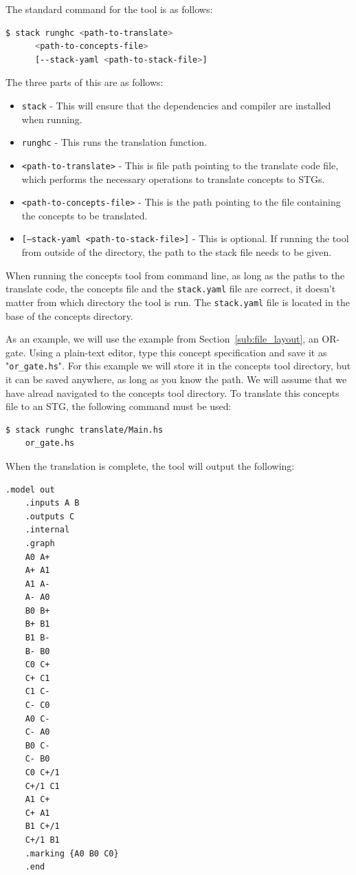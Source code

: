 \documentclass[british,conference,compsoc]{IEEEtran}
\begin{document}
The standard command for the tool is as follows:

\begin{lstlisting}[language=bash]
  $ stack runghc <path-to-translate> 
      <path-to-concepts-file> 
      [--stack-yaml <path-to-stack-file>]
\end{lstlisting}

The three parts of this are as follows:
\begin{itemize}
  \item \texttt{stack} - This will ensure that the dependencies and compiler 
  	are installed when running.
  \item \texttt{runghc} - This runs the translation function.
  \item \texttt{<path-to-translate>} - This is file path pointing to the 
  	translate code file, which performs the necessary operations to translate 
	concepts to STGs.
  \item \texttt{<path-to-concepts-file>} - This is the path pointing to the file
  	containing the concepts to be translated.
  \item \texttt{[--stack-yaml <path-to-stack-file>]} - This is optional. If 
  	running the tool from outside of the directory, the path to the stack file 
	 needs to be given.
\end{itemize}

When running the concepts tool from command line, as long as the paths to the 
translate code, the concepts file and the \texttt{stack.yaml} file are correct,
it doesn't matter from which directory the tool is run.  The \texttt{stack.yaml}
file is located in the base of the concepts directory.

As an example, we will use the example from Section~\ref{sub:file_layout}, an 
OR-gate. Using a plain-text editor, type this concept specification and save it
as "\texttt{or\_gate.hs}". For this example we will store it in the concepts
tool directory, but it can be saved anywhere, as long as you know the path.
We will assume that we have alread navigated to the concepts tool
directory. To translate this concepts file to an STG, the following command
must be used:

\begin{lstlisting}[language=bash]
  $ stack runghc translate/Main.hs 
  	or_gate.hs
\end{lstlisting}

When the translation is complete, the tool will output the following:

\begin{lstlisting}[language=bash]
	.model out
	.inputs A B
	.outputs C
	.internal
	.graph
	A0 A+
	A+ A1
	A1 A-
	A- A0
	B0 B+
	B+ B1
	B1 B-
	B- B0
	C0 C+
	C+ C1
	C1 C-
	C- C0
	A0 C-
	C- A0
	B0 C-
	C- B0
	C0 C+/1
	C+/1 C1
	A1 C+
	C+ A1
	B1 C+/1
	C+/1 B1
	.marking {A0 B0 C0}
	.end
\end{lstlisting}
\end{document}

